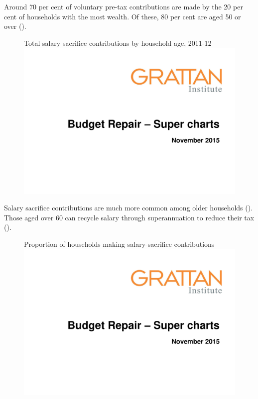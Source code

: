 \documentclass{grattanAlpha}
\begin{document}
Around 70 per cent of voluntary pre-tax contributions are made by the 20 per cent of households with the most wealth. Of these, 80 per cent are aged 50 or over (). 

\begin{figure}
%
{Total salary sacrifice contributions by household age, 2011-12}\label{fig:SUPER-A-4}
\includegraphics[width=\columnwidth,page=38]{super-atlas/PPTX.pdf}

\end{figure}

Salary sacrifice contributions are much more common among older households (). Those aged over 60 can recycle salary through superannuation to reduce their tax ().

\begin{figure}
%
{Proportion of households making salary-sacrifice contributions}\label{fig:SUPER-A-5}
\includegraphics[width=\columnwidth,page=39]{super-atlas/PPTX.pdf}
\end{figure}
\end{document}
